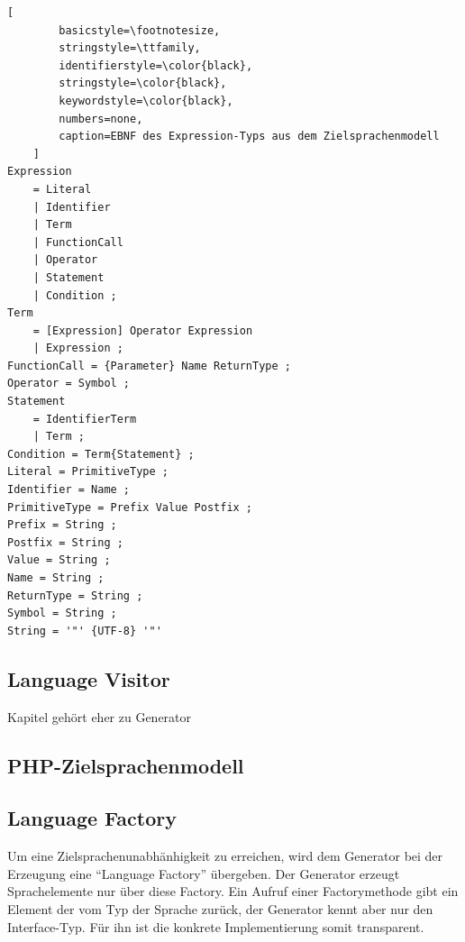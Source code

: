 \begin{lstlisting}[
        basicstyle=\footnotesize,
        stringstyle=\ttfamily,
        identifierstyle=\color{black},
        stringstyle=\color{black},
        keywordstyle=\color{black},
        numbers=none,
        caption=EBNF des Expression-Typs aus dem Zielsprachenmodell
    ]
Expression 
    = Literal 
    | Identifier
    | Term
    | FunctionCall
    | Operator
    | Statement
    | Condition ;
Term 
    = [Expression] Operator Expression 
    | Expression ;
FunctionCall = {Parameter} Name ReturnType ;
Operator = Symbol ;
Statement 
    = IdentifierTerm 
    | Term ;
Condition = Term{Statement} ;
Literal = PrimitiveType ;
Identifier = Name ;
PrimitiveType = Prefix Value Postfix ;
Prefix = String ;
Postfix = String ;
Value = String ;
Name = String ;
ReturnType = String ;
Symbol = String ;
String = '"' {UTF-8} '"'

\end{lstlisting}

\subsection{Language Visitor}
\label{sec:language_visitor}

Kapitel gehört eher zu Generator

\subsection{PHP-Zielsprachenmodell}
\label{sec:php_target_language_model}

\subsection{Language Factory}
\label{sec:language_factory}

Um eine Zielsprachenunabhänhigkeit zu erreichen, wird dem Generator bei der Erzeugung eine \enquote{Language Factory} übergeben. Der Generator erzeugt Sprachelemente nur über diese Factory. Ein Aufruf einer Factorymethode gibt ein Element der vom Typ der Sprache zurück, der Generator kennt aber nur den Interface-Typ. Für ihn ist die konkrete Implementierung somit transparent.
